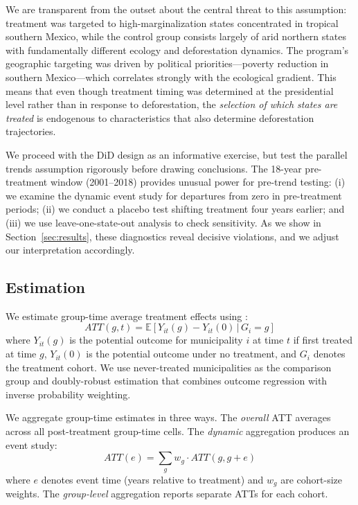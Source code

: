 \documentclass[12pt]{article}
\newcommand{\E}{\mathbb{E}}
\begin{document}
We are transparent from the outset about the central threat to this assumption: treatment was targeted to high-marginalization states concentrated in tropical southern Mexico, while the control group consists largely of arid northern states with fundamentally different ecology and deforestation dynamics. The program's geographic targeting was driven by political priorities---poverty reduction in southern Mexico---which correlates strongly with the ecological gradient. This means that even though treatment timing was determined at the presidential level rather than in response to deforestation, the \textit{selection of which states are treated} is endogenous to characteristics that also determine deforestation trajectories.

We proceed with the DiD design as an informative exercise, but test the parallel trends assumption rigorously before drawing conclusions. The 18-year pre-treatment window (2001--2018) provides unusual power for pre-trend testing: (i) we examine the dynamic event study for departures from zero in pre-treatment periods; (ii) we conduct a placebo test shifting treatment four years earlier; and (iii) we use leave-one-state-out analysis to check sensitivity. As we show in Section~\ref{sec:results}, these diagnostics reveal decisive violations, and we adjust our interpretation accordingly.

\subsection{Estimation}

We estimate group-time average treatment effects using \citet{callaway2021difference}:
\begin{equation}
ATT(g,t) = \E[Y_{it}(g) - Y_{it}(0) \,|\, G_i = g]
\end{equation}
where $Y_{it}(g)$ is the potential outcome for municipality $i$ at time $t$ if first treated at time $g$, $Y_{it}(0)$ is the potential outcome under no treatment, and $G_i$ denotes the treatment cohort. We use never-treated municipalities as the comparison group and doubly-robust estimation that combines outcome regression with inverse probability weighting.

We aggregate group-time estimates in three ways. The \textit{overall} ATT averages across all post-treatment group-time cells. The \textit{dynamic} aggregation produces an event study:
\begin{equation}
ATT(e) = \sum_g w_g \cdot ATT(g, g+e)
\end{equation}
where $e$ denotes event time (years relative to treatment) and $w_g$ are cohort-size weights. The \textit{group-level} aggregation reports separate ATTs for each cohort.
\end{document}
